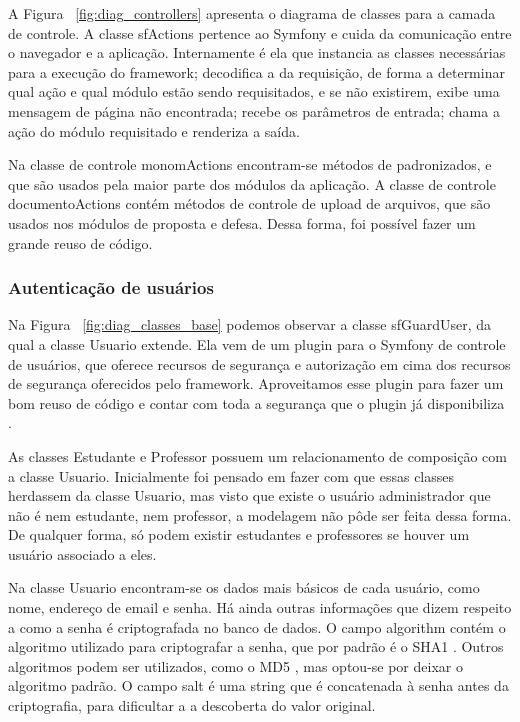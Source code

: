 A Figura ~\ref{fig:diag_controllers} apresenta o diagrama de classes para a camada de controle.
A classe sfActions pertence ao Symfony e cuida da comunicação entre o navegador e a aplicação. 
Internamente é ela que instancia as classes necessárias para a execução do framework; decodifica
a  da requisição, de forma a determinar qual ação e qual módulo estão 
sendo requisitados, e se não existirem, exibe uma mensagem de página não encontrada; recebe os
parâmetros de entrada; chama a ação do módulo requisitado e renderiza a saída. 

Na classe de controle monomActions encontram-se métodos de  
padronizados, e que são usados pela maior parte dos módulos da aplicação. A classe de controle
documentoActions contém métodos de controle de upload de arquivos, que são usados nos módulos de 
proposta e defesa. Dessa forma, foi possível fazer um grande reuso de código.


\subsubsection{Autenticação de usuários}
Na Figura ~\ref{fig:diag_classes_base} podemos observar a classe sfGuardUser, da qual a classe Usuario extende.
Ela vem de um plugin para o Symfony de controle de usuários, que oferece recursos de segurança
e autorização em cima dos recursos de segurança oferecidos pelo framework. Aproveitamos esse plugin
para fazer um bom reuso de código e contar com toda a segurança que o plugin já disponibiliza \cite{sfguardplugin}.

As classes Estudante e Professor possuem um relacionamento de composição com a classe Usuario.
Inicialmente foi pensado em fazer com que essas classes herdassem da classe Usuario, mas visto
que existe o usuário administrador que não é nem estudante, nem professor, a modelagem não pôde
ser feita dessa forma. De qualquer forma, só podem existir estudantes e professores se houver um usuário
associado a eles.

Na classe Usuario encontram-se os dados mais básicos de cada usuário, como nome, endereço de email e senha.
Há ainda outras informações que dizem respeito a como a senha é criptografada no banco de dados. 
O campo algorithm contém o algoritmo utilizado para criptografar a senha, que por padrão é o SHA1 \cite{rfc3174}. 
Outros algoritmos podem ser utilizados, como o MD5 \cite{rfc1321}, mas optou-se por deixar o algoritmo padrão.
O campo salt é uma string que é concatenada à senha antes da criptografia, para dificultar a a 
descoberta do valor original.


